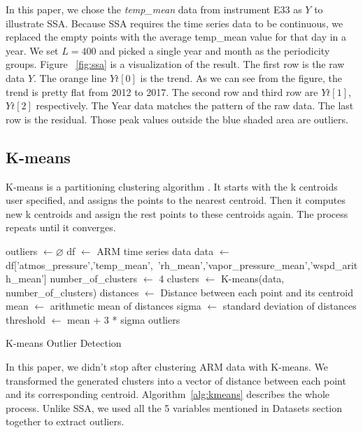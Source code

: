 \documentclass[letterpaper, 10 pt, conference]{ieeeconf}  %
\begin{document}
In this paper, we chose the \textit{temp\_mean} data from instrument E33 as $Y$ to illustrate SSA. Because SSA requires the time series data to be continuous, we replaced the empty points with the average temp\_mean value for that day in a year. We set $L = 400$ and picked a single year and month as the periodicity groups. Figure~ \ref{fig:ssa} is a visualization of the result. The first row is the raw data $Y$. The orange line $Yt[0]$ is the trend. As we can see from the figure, the trend is pretty flat from 2012 to 2017. The second row and third row are $Yt[1]$, $Yt[2]$ respectively. The Year data matches the pattern of the raw data. The last row is the residual. Those peak values outside the blue shaded area are outliers.

\subsection{K-means}
K-means is a partitioning clustering algorithm \cite{macqueen1967some, hartigan1979algorithm}. It starts with the k centroids user specified, and assigns the points to the nearest centroid. Then it computes new k centroids and assign the rest points to these centroids again. The process repeats until it converges. 

\begin{algorithm}[ht]
\DontPrintSemicolon
\SetAlgoLined
\BlankLine

outliers $\leftarrow \varnothing$\;
df $\leftarrow$ ARM time series data\;
data $\leftarrow$ df['atmos\_pressure','temp\_mean',\
'rh\_mean','vapor\_pressure\_mean','wspd\_arith\_mean']\;
number\_of\_clusters $\leftarrow$ 4\;
clusters $\leftarrow$ K-means(data, number\_of\_clusters)\;
distances $\leftarrow$ Distance between each point and its centroid\;
mean $\leftarrow$ arithmetic mean of distances\;
sigma $\leftarrow$ standard deviation of distances\;
threshold $\leftarrow$ mean + 3 * sigma\;
\Return outliers
\caption{K-means Outlier Detection}\label{alg:kmeans}
\end{algorithm}

In this paper, we didn't stop after clustering ARM data with K-means. We transformed the generated clusters into a vector of distance between each point and its corresponding centroid. Algorithm~\ref{alg:kmeans} describes the whole process. Unlike SSA, we used all the 5 variables mentioned in Datasets section together to extract outliers.
\end{document}
